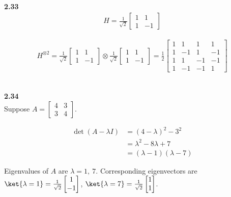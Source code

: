 \documentclass[10pt]{book}
\newcommand{\Textbf}[1]{\hspace{3mm}\\ \textbf{#1}\\}
\begin{document}
	
	\Textbf{2.33}
	\begin{equation}
			\begin{aligned}
			H  = \frac{1}{\sqrt{2}} \begin{bmatrix}
				1 & 1 \\
				1 & -1
			\end{bmatrix}
		\end{aligned}
	\end{equation}

	
	\begin{equation}
\begin{aligned}
		H^{\otimes 2}
		=
		\frac{1}{\sqrt{2}} \begin{bmatrix}
			1 & 1 \\
			1 & -1
		\end{bmatrix}
		\otimes
		\frac{1}{\sqrt{2}} \begin{bmatrix}
			1 & 1 \\
			1 & -1
		\end{bmatrix}
		=
		\frac{1}{2} \begin{bmatrix}
			1 & 1 & 1 & 1 \\
			1 & -1 & 1 & -1 \\
			1 & 1 & -1 & -1 \\
			1 & -1 & -1 & 1
		\end{bmatrix}
	\end{aligned}
\end{equation}
	
	
	
	\Textbf{2.34}
	
	Suppose $A = \begin{bmatrix}
		4 & 3 \\
		3 & 4
	\end{bmatrix} $.
	
	\begin{equation}
\begin{aligned}
		\det (A - \lambda I ) &= (4-\lambda)^2 - 3^2\\
		&= \lambda^2 -8\lambda + 7\\
		&= (\lambda - 1)(\lambda - 7)
	\end{aligned}
\end{equation}
	
	Eigenvalues of $A$ are $\lambda = 1, ~ 7$.
	Corresponding eigenvectors are
	$
	\ket{\lambda = 1} = \frac{1}{\sqrt{2}} \begin{bmatrix}
		1 \\
		-1
	\end{bmatrix}
	$,
	$
	\ket{\lambda = 7} = \frac{1}{\sqrt{2}} \begin{bmatrix}
		1 \\
		1
	\end{bmatrix}
	$.
	
\end{document}
